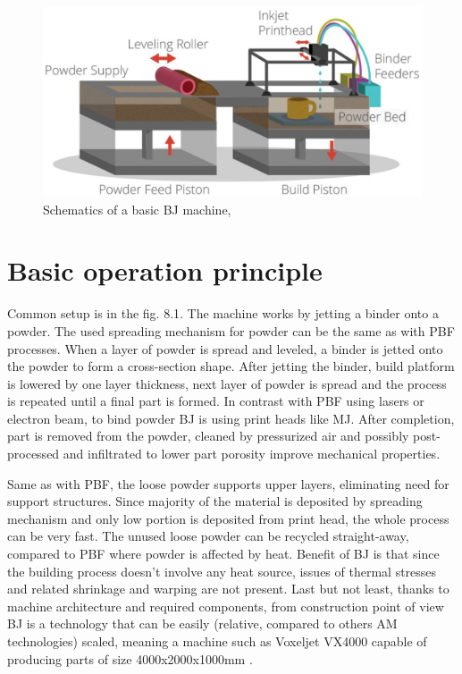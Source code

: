 \documentclass[a4paper, twoside, 11pt]{report}
\begin{document}
\begin{figure}[h]
	\centering
	\includegraphics[scale=0.7]{BJthreeding}
	\caption{Schematics of a basic BJ machine, \cite{threeding}}
\end{figure}

\section{Basic operation principle}
Common setup is in the fig. 8.1. The machine works by jetting a binder onto a powder. The used spreading mechanism for powder can be the same as with PBF processes. When a layer of powder is spread and leveled, a binder is jetted onto the powder to form a cross-section shape. After jetting the binder, build platform is lowered by one layer thickness, next layer of powder is spread and the process is repeated until a final part is formed. In contrast with PBF using lasers or electron beam, to bind powder BJ is using print heads like MJ. After completion, part is removed from the powder, cleaned by pressurized air and possibly post-processed and infiltrated to lower part porosity improve mechanical properties.

	Same as with PBF, the loose powder supports upper layers, eliminating need for support structures. Since majority of the material is deposited by spreading mechanism and only low portion is deposited from print head, the whole process can be very fast. The unused loose powder can be recycled straight-away, compared to PBF where powder is affected by heat. Benefit of BJ is that since the building process doesn't involve any heat source, issues of thermal stresses and related shrinkage and warping are not present. Last but not least, thanks to machine architecture and required components, from construction point of view BJ is a technology that can be easily (relative, compared to others AM technologies) scaled, meaning a machine such as Voxeljet VX4000 capable of producing parts of size 4000x2000x1000mm \cite{voxeljet}.
\end{document}
